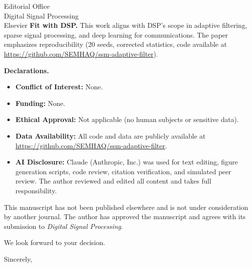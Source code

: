 \documentclass[11pt,a4paper]{letter}
\begin{document}
\begin{letter}{Editorial Office\\Digital Signal Processing\\Elsevier}
\textbf{Fit with DSP.} This work aligns with DSP's scope in adaptive filtering, sparse signal processing, and deep learning for communications. The paper emphasizes reproducibility (20 seeds, corrected statistics, code available at \url{https://github.com/SEMHAQ/ssm-adaptive-filter}).

\textbf{Declarations.}
\begin{itemize}
    \item \textbf{Conflict of Interest:} None.
    \item \textbf{Funding:} None.
    \item \textbf{Ethical Approval:} Not applicable (no human subjects or sensitive data).
    \item \textbf{Data Availability:} All code and data are publicly available at \url{https://github.com/SEMHAQ/ssm-adaptive-filter}.
    \item \textbf{AI Disclosure:} Claude (Anthropic, Inc.) was used for text editing, figure generation scripts, code review, citation verification, and simulated peer review. The author reviewed and edited all content and takes full responsibility.
\end{itemize}

This manuscript has not been published elsewhere and is not under consideration by another journal. The author has approved the manuscript and agrees with its submission to \textit{Digital Signal Processing}.

We look forward to your decision.

\closing{Sincerely,}

\end{letter}
\end{document}

